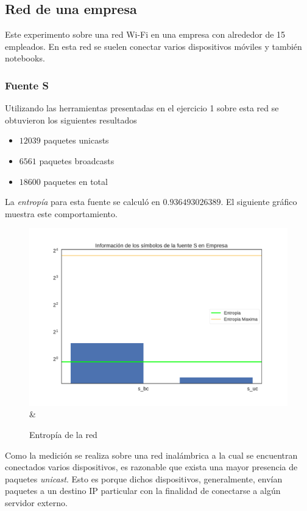 
\subsection{Red de una empresa}
Este experimento sobre una red Wi-Fi en una empresa con alrededor de 15 empleados. En esta red se suelen conectar varios dispositivos móviles y también notebooks.

\subsubsection{Fuente S}

Utilizando las herramientas presentadas en el ejercicio 1 sobre esta red se obtuvieron los siguientes resultados
\begin{itemize}
 \item $12039$ paquetes unicasts
 \item $6561$ paquetes broadcasts
 \item $18600$ paquetes en total
\end{itemize}

 La \emph{entropía} para esta fuente se calculó en  $0.936493026389$. El siguiente gráfico muestra este comportamiento. \par


\begin{figure}[H]
   \centering
       \includegraphics[page=1,width=.70\textwidth]{../img/barras-Empresa} &
 \caption{Entropía de la red}
 \label{fig:Test}
\end{figure}





 Como la medición se realiza sobre una red inalámbrica a la cual se encuentran conectados varios dispositivos, es razonable que exista una mayor presencia de paquetes \emph{unicast}. Esto es porque dichos dispositivos, generalmente, envían paquetes a un destino IP particular con la finalidad de conectarse a algún servidor externo. \par


